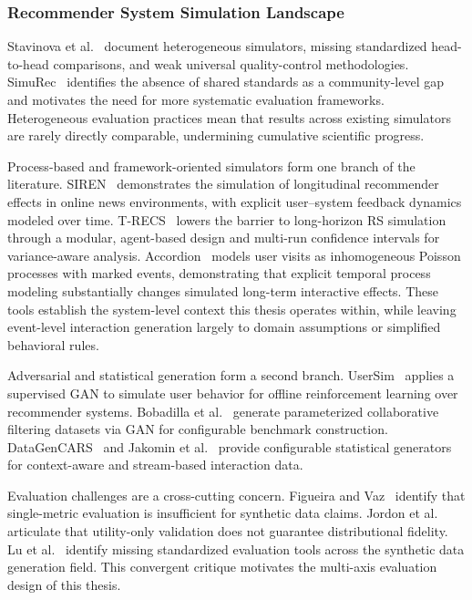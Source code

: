 \documentclass[sigconf,nonacm]{acmart}
\begin{document}
\subsubsection{Recommender System Simulation Landscape}
Stavinova et al.~\cite{stavinova2022survey} document heterogeneous
simulators, missing standardized head-to-head comparisons, and weak universal
quality-control methodologies. SimuRec~\cite{ekstrand2021simurec} identifies
the absence of shared standards as a community-level gap and motivates the
need for more systematic evaluation frameworks. Heterogeneous evaluation
practices mean that results across existing simulators are rarely directly
comparable, undermining cumulative scientific progress.

Process-based and framework-oriented simulators form one branch of the
literature. SIREN~\cite{bountouridis2019siren} demonstrates the simulation of
longitudinal recommender effects in online news environments, with explicit
user--system feedback dynamics modeled over time.
T-RECS~\cite{lucherini2021trecs} lowers the barrier to long-horizon RS
simulation through a modular, agent-based design and multi-run confidence
intervals for variance-aware analysis. Accordion~\cite{mcinerney2021accordion}
models user visits as inhomogeneous Poisson processes with marked events,
demonstrating that explicit temporal process modeling substantially changes
simulated long-term interactive effects. These tools establish the
system-level context this thesis operates within, while leaving event-level
interaction generation largely to domain assumptions or simplified
behavioral rules.

Adversarial and statistical generation form a second branch.
UserSim~\cite{zhao2021usersim} applies a supervised GAN to simulate user
behavior for offline reinforcement learning over recommender systems.
Bobadilla et al.~\cite{bobadilla2023ganrs} generate parameterized
collaborative filtering datasets via GAN for configurable benchmark
construction. DataGenCARS~\cite{delcarmen2017datacgencars} and Jakomin et
al.~\cite{jakomin2018gids} provide configurable statistical generators for
context-aware and stream-based interaction data.

Evaluation challenges are a cross-cutting concern. Figueira and
Vaz~\cite{figueira2022survey} identify that single-metric evaluation is
insufficient for synthetic data claims. Jordon et
al.~\cite{jordon2022synthetic} articulate that utility-only validation does
not guarantee distributional fidelity. Lu et al.~\cite{lu2024review} identify
missing standardized evaluation tools across the synthetic data generation
field. This convergent critique motivates the multi-axis evaluation design
of this thesis.
\end{document}
